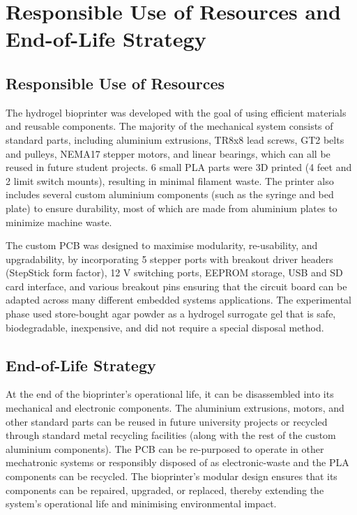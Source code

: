 \chapter{Responsible Use of Resources and End-of-Life Strategy }
\section*{Responsible Use of Resources}
The hydrogel bioprinter was developed with the goal of using efficient materials and reusable components. The majority of the mechanical system consists of standard parts, including aluminium extrusions, TR8x8 lead screws, GT2 belts and pulleys, NEMA17 stepper motors, and linear bearings, which can all be reused in future student projects. 6 small PLA parts were 3D printed (4 feet and 2 limit switch mounts), resulting in minimal filament waste. The printer also includes several custom aluminium components (such as the syringe and bed plate) to ensure durability, most of which are made from aluminium plates to minimize machine waste.

The custom PCB was designed to maximise modularity, re-usability, and upgradability, by incorporating 5 stepper ports with breakout driver headers (StepStick form factor), 12 V switching ports, EEPROM storage, USB and SD card interface, and various breakout pins ensuring that the circuit board can be adapted across many different embedded systems applications. The experimental phase used store-bought agar powder as a hydrogel surrogate gel that is safe, biodegradable, inexpensive, and did not require a special disposal method.

\section*{End-of-Life Strategy}

At the end of the bioprinter's operational life, it can be disassembled into its mechanical and electronic components. The aluminium extrusions, motors, and other standard parts can be reused in future university projects or recycled through standard metal recycling facilities (along with the rest of the custom aluminium components). The PCB can be re-purposed to operate in other mechatronic systems or responsibly disposed of as electronic-waste and the PLA components can be recycled. The bioprinter’s modular design ensures that its components can be repaired, upgraded, or replaced, thereby extending the system's operational life and minimising environmental impact.